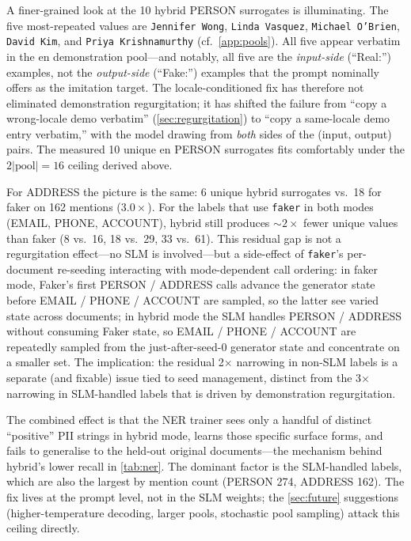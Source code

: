 \documentclass[11pt]{article}
\newcommand{\code}[1]{\texttt{#1}}
\newcommand{\faker}{\code{faker}}
\begin{document}
A finer-grained look at the 10 hybrid PERSON surrogates is
illuminating. The five most-repeated values are \code{Jennifer Wong},
\code{Linda Vasquez}, \code{Michael O'Brien}, \code{David Kim}, and
\code{Priya Krishnamurthy} (cf.\ \cref{app:pools}). All five appear
verbatim in the en demonstration pool---and notably, all five are the
\emph{input-side} (``Real:'') examples, not the \emph{output-side}
(``Fake:'') examples that the prompt nominally offers as the imitation
target. The locale-conditioned fix has therefore not eliminated
demonstration regurgitation; it has shifted the failure from
``copy a wrong-locale demo verbatim'' (\cref{sec:regurgitation}) to
``copy a same-locale demo entry verbatim,'' with the model drawing
from \emph{both} sides of the (input, output) pairs. The measured 10
unique en PERSON surrogates fits comfortably under the $2|\text{pool}|
= 16$ ceiling derived above.

For ADDRESS the picture is the same: 6 unique hybrid surrogates vs.\
18 for faker on 162 mentions ($3.0\times$). For the labels that use
\faker{} in both modes (EMAIL, PHONE, ACCOUNT), hybrid still produces
$\sim$$2\times$ fewer unique values than faker (8 vs.\ 16, 18 vs.\
29, 33 vs.\ 61). This residual gap is not a regurgitation effect---no
SLM is involved---but a side-effect of \faker{}'s per-document
re-seeding interacting with mode-dependent call ordering: in faker
mode, Faker's first PERSON / ADDRESS calls advance the generator
state before EMAIL / PHONE / ACCOUNT are sampled, so the latter see
varied state across documents; in hybrid mode the SLM handles
PERSON / ADDRESS without consuming Faker state, so EMAIL / PHONE /
ACCOUNT are repeatedly sampled from the just-after-seed-0 generator
state and concentrate on a smaller set. The implication: the residual
2$\times$ narrowing in non-SLM labels is a separate (and fixable)
issue tied to seed management, distinct from the 3$\times$ narrowing
in SLM-handled labels that is driven by demonstration regurgitation.

The combined effect is that the NER trainer sees only a handful of
distinct ``positive'' PII strings in hybrid mode, learns those
specific surface forms, and fails to generalise to the held-out
original documents---the mechanism behind hybrid's lower recall in
\cref{tab:ner}. The dominant factor is the SLM-handled labels, which
are also the largest by mention count (PERSON 274, ADDRESS 162). The
fix lives at the prompt level, not in the SLM weights; the
\cref{sec:future} suggestions (higher-temperature decoding, larger
pools, stochastic pool sampling) attack this ceiling directly.
\end{document}
